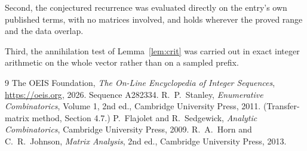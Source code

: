\documentclass[11pt,a4paper]{article}
\theoremstyle{plain}
\theoremstyle{definition}
\begin{document}
Second, the conjectured recurrence was evaluated directly on the entry's own published terms,
with no matrices involved, and holds wherever the proved range and the data overlap.

Third, the annihilation test of Lemma~\ref{lem:crit} was carried out in exact integer
arithmetic on the whole vector rather than on a sampled prefix.

\begin{thebibliography}{9}
 The OEIS Foundation, \emph{The On-Line Encyclopedia of Integer
Sequences}, \url{https://oeis.org}, 2026. Sequence A282334.
 R.~P.~Stanley, \emph{Enumerative Combinatorics}, Volume 1, 2nd ed.,
Cambridge University Press, 2011. (Transfer-matrix method, Section 4.7.)
 P.~Flajolet and R.~Sedgewick, \emph{Analytic Combinatorics}, Cambridge
University Press, 2009.
 R.~A.~Horn and C.~R.~Johnson, \emph{Matrix Analysis}, 2nd ed., Cambridge
University Press, 2013.
\end{thebibliography}
\end{document}
